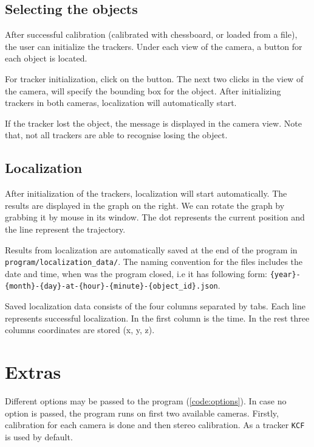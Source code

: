 \subsection{Selecting the objects}
After successful calibration (calibrated with chessboard, or loaded from a
file), the user can initialize the trackers. Under each view of the camera, a button
for each object is located.

For tracker initialization, click on the button. The next two clicks in the
view of the camera, will specify the bounding box for the object. After
initializing trackers in both cameras, localization will automatically start.

If the tracker lost the object, the message is displayed in the camera
view. Note that, not all trackers are able to recognise losing the object.

\subsection{Localization}

After initialization of the trackers, localization will start automatically.
The results are displayed in the graph on the right. We can rotate the graph by
grabbing it by mouse in its window. The dot represents the current position and
the line represent the trajectory.

Results from localization are automatically saved at the end of the program in
\verb+program/localization_data/+. The naming convention for the files includes
the date and time, when was the program closed, i.e it has following form:
\verb+{year}-{month}-{day}-at-{hour}-{minute}-{object_id}.json+.

Saved localization data consists of the four columns separated by tabs. Each
line represents successful localization. In the first column is the time. In the
rest three columns coordinates are stored (x, y, z).

\section{Extras}

Different options may be passed to the program (\ref{code:options}). In case no option
is passed, the program runs on first two available cameras. Firstly, calibration for
each camera is done and then stereo calibration. As a tracker \verb+KCF+ is used by default.

\begin{figure}
\lstset{basicstyle=\ttfamily\footnotesize,breaklines=true,frame=lrtb}

\end{figure}

